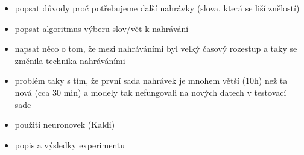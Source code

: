 \begin{itemize}
  \item popsat důvody proč potřebujeme další nahrávky (slova, která se liší znělostí)
  \item popsat algoritmus výberu slov/vět k nahrávání
  \item napsat něco o tom, že mezi nahráváními byl velký časový rozestup a taky se změnila technika nahráváními
  \item problém taky s tím, že první sada nahrávek je mnohem větší (10h) než ta nová (cca 30 min) a modely tak nefungovali na nových datech v testovací sade
  \item použití neuronovek (Kaldi)
  \item popis a výsledky experimentu 
\end{itemize}
